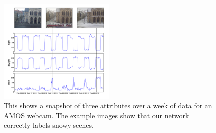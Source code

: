 \documentclass[10pt,twocolumn,letterpaper]{article}
\begin{document}


\begin{figure}[t]
	\centering
		\includegraphics[width=0.5\textwidth, trim= 5mm 15mm 0mm 10mm]{figs/attr_compare.pdf}
		\caption{This shows a snapshot of three attributes over a week of data for
             an AMOS webcam.  The example images show that our network 
             correctly labels snowy scenes.}
		\label{fig:attrcmp}
\end{figure}
\end{document}
